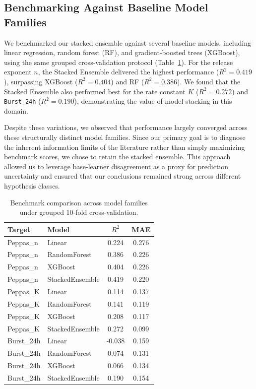 \documentclass[preprint,12pt,authoryear]{elsarticle}
\begin{document}
\subsection{Benchmarking Against Baseline Model Families}

We benchmarked our stacked ensemble against several baseline models, including linear regression, random forest (RF), and gradient-boosted trees (XGBoost), using the same grouped cross-validation protocol (Table~\ref{tab:benchmarking}). For the release exponent $n$, the Stacked Ensemble delivered the highest performance ($R^2 = 0.419$), surpassing XGBoost ($R^2 = 0.404$) and RF ($R^2 = 0.386$). We found that the Stacked Ensemble also performed best for the rate constant $K$ ($R^2 = 0.272$) and \texttt{Burst\_24h} ($R^2 = 0.190$), demonstrating the value of model stacking in this domain.

Despite these variations, we observed that performance largely converged across these structurally distinct model families. Since our primary goal is to diagnose the inherent information limits of the literature rather than simply maximizing benchmark scores, we chose to retain the stacked ensemble. This approach allowed us to leverage base-learner disagreement as a proxy for prediction uncertainty and ensured that our conclusions remained strong across different hypothesis classes.


\begin{table}[H]
\centering
\caption{Benchmark comparison across model families under grouped 10-fold cross-validation.}
\label{tab:benchmarking}
\begin{tabular}{llcc}
\toprule
Target & Model & $R^2$ & MAE \\
\midrule
Peppas\_n & Linear & 0.224 & 0.276 \\
Peppas\_n & RandomForest & 0.386 & 0.226 \\
Peppas\_n & XGBoost & 0.404 & 0.226 \\
Peppas\_n & StackedEnsemble & 0.419 & 0.220 \\
\midrule
Peppas\_K & Linear & 0.114 & 0.137 \\
Peppas\_K & RandomForest & 0.141 & 0.119 \\
Peppas\_K & XGBoost & 0.208 & 0.117 \\
Peppas\_K & StackedEnsemble & 0.272 & 0.099 \\
\midrule
Burst\_24h & Linear & -0.038 & 0.159 \\
Burst\_24h & RandomForest & 0.074 & 0.131 \\
Burst\_24h & XGBoost & 0.066 & 0.134 \\
Burst\_24h & StackedEnsemble & 0.190 & 0.154 \\
\bottomrule
\end{tabular}
\end{table}
\end{document}
